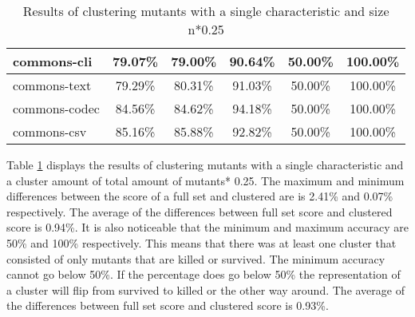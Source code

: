\documentclass[../main]{subfiles}
\begin{document}
\begin{table}[!htb]
\begin{tabular}{|l|c|c|c|c|c|}
commons-cli                   & 79.07\%                                                                                 & 79.00\%                                                                                     & 90.64\%                                                                              & 50.00\%                                                                               & 100.00\%                                                                             \\ \hline
commons-text                  & 79.29\%                                                                                 & 80.31\%                                                                                     & 91.03\%                                                                              & 50.00\%                                                                               & 100.00\%                                                                             \\ \hline
commons-codec                 & 84.56\%                                                                                 & 84.62\%                                                                                     & 94.18\%                                                                              & 50.00\%                                                                               & 100.00\%                                                                             \\ \hline
commons-csv                   & 85.16\%                                                                                 & 85.88\%                                                                                     & 92.82\%                                                                              & 50.00\%                                                                               & 100.00\%                                                                             \\ \hline
\end{tabular}
\caption{\label{tab:clustering_single_25}Results of clustering mutants with a single characteristic and size n*0.25}
\end{table}
\FloatBarrier

Table \ref{tab:clustering_single_25} displays the results of clustering mutants with a single characteristic and a cluster amount of total amount of mutants* 0.25.  
The maximum and minimum differences between the score of a full set and clustered are is 2.41\% and 0.07\% respectively.  
The average of the differences between full set score and clustered score is 0.94\%.
It is also noticeable that the minimum and maximum accuracy are 50\% and 100\% respectively.
This means that there was at least one cluster that consisted of only mutants that are killed or survived.
The minimum accuracy cannot go below 50\%.
If the percentage does go below 50\% the representation of a cluster will flip from survived to killed or the other way around.
The average of the differences between full set score and clustered score is 0.93\%.
\end{document}

